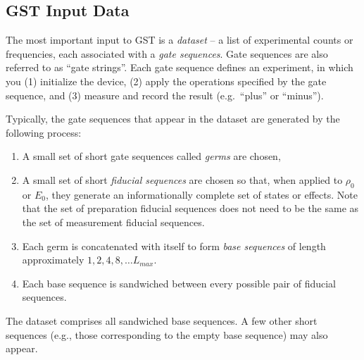 \documentclass{article}[11pt]
\begin{document}



\subsection{GST Input Data}

The most important input to GST is a \emph{dataset} -- a list of experimental counts or frequencies, each associated with a \emph{gate sequences}.  Gate sequences are also referred to as ``gate strings''.  Each gate sequence defines an experiment, in which you (1) initialize the device, (2) apply the operations specified by the gate sequence, and (3) measure and record the result (e.g.~``plus'' or ``minus'').

Typically, the gate sequences that appear in the dataset are generated by the following process:
\begin{enumerate}
\item A small set of short gate sequences called \emph{germs} are chosen,
\item A small set of short \emph{fiducial sequences} are chosen so that, when applied to $\rho_0$ or $E_0$, they generate an informationally complete set of states or effects.  Note that the set of preparation fiducial sequences does not need to be the same as the set of measurement fiducial sequences.
\item Each germ is concatenated with itself to form \emph{base sequences} of length approximately $1,2,4,8,\ldots L_{max}$.
\item Each base sequence is sandwiched between every possible pair of fiducial sequences.
\end{enumerate}
The dataset comprises all sandwiched base sequences.  A few other short sequences (e.g., those corresponding to the empty base sequence) may also appear.
\end{document}
